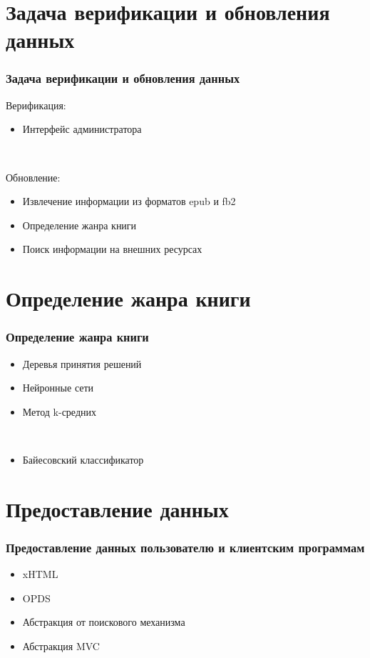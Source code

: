 \documentclass[handout]{beamer}
\begin{document}
\section{Задача верификации и обновления данных}
  \begin{frame}
    \frametitle{Задача верификации и обновления данных}
  
    Верификация:
    \begin{itemize}
      \item Интерфейс администратора
    \end{itemize}

    \ 
    
  	Обновление:
    \begin{itemize}
      \item Извлечение информации из форматов epub и fb2 
      \item Определение жанра книги
      \item Поиск информации на внешних ресурсах
    \end{itemize}

  \end{frame}
  

\section{Определение жанра книги}
  \begin{frame}
    \frametitle{Определение жанра книги}  
    
    \begin{itemize}
      \item Деревья принятия решений
      \item Нейронные сети
      \item Метод k-средних
		
	  \ 
		
      \item Байесовский классификатор
    \end{itemize}        
  \end{frame}

\section{Предоставление данных}
  \begin{frame}
    \frametitle{Предоставление данных пользователю и клиентским программам}  
    
    \begin{itemize}
      \item xHTML
      \item OPDS
    \end{itemize}        

	\begin{itemize}
      \item Абстракция от поискового механизма
      \item Абстракция MVC
    \end{itemize}        
    
  \end{frame}
\end{document}
